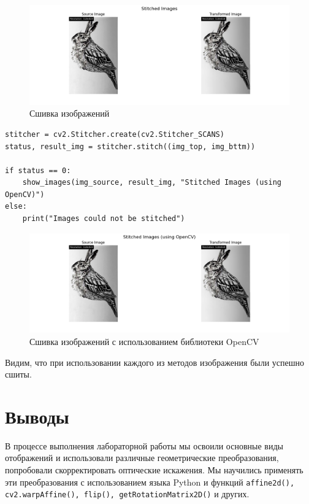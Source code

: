 \begin{figure}[ht]
    \includegraphics[width=\textwidth]{../results/Stitched Images.png}
    \caption{Сшивка изображений}
    \label{fig:stitched_images}
\end{figure}


\begin{lstlisting}[style=python_white, caption={Исходный код для сшивки изображений с использованием библиотеки OpenCV}]
stitcher = cv2.Stitcher.create(cv2.Stitcher_SCANS)
status, result_img = stitcher.stitch((img_top, img_bttm))

if status == 0:
    show_images(img_source, result_img, "Stitched Images (using OpenCV)")
else:
    print("Images could not be stitched")
\end{lstlisting}

\begin{figure}[ht]
    \includegraphics[width=\textwidth]{../results/Stitched Images (using OpenCV).png}
    \caption{Сшивка изображений с использованием библиотеки OpenCV}
    \label{fig:stitched_images_cv}
\end{figure}

Видим, что при использовании каждого из методов изображения были успешно сшиты.

\pagebreak
\section{Выводы}
В процессе выполнения лабораторной работы мы освоили основные виды отображений и использовали различные геометрические преобразования, попробовали скорректировать оптические искажения. Мы научились применять эти преобразования с использованием языка Python и функций \texttt{affine2d(), cv2.warpAffine(), flip(), getRotationMatrix2D()} и других. 

